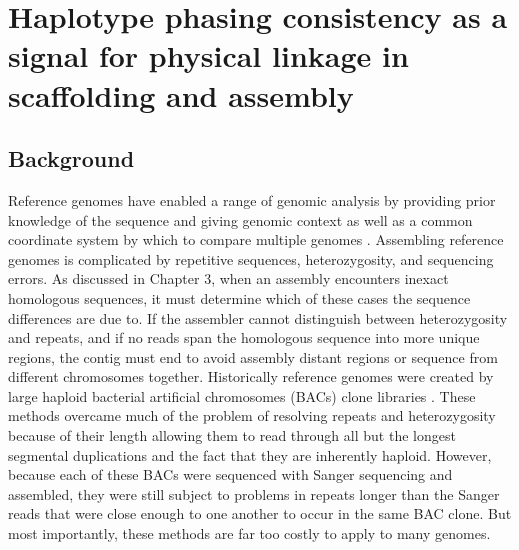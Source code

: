 %
\chapter{Haplotype phasing consistency as a signal for physical linkage in scaffolding and assembly}

\ifpdf
    \graphicspath{{Chapter4/Figs/Raster/}{Chapter4/Figs/PDF/}{Chapter4/Figs/}}
\else
    \graphicspath{{Chapter4/Figs/Vector/}{Chapter4/Figs/}}
\fi



\section{Background}
\par{
Reference genomes have enabled a range of genomic analysis by providing prior knowledge of the sequence 
and giving genomic context as well as a common coordinate system by which to compare multiple genomes \cite{1000genomes} \cite{GRCh38}. Assembling reference genomes is complicated by repetitive sequences, heterozygosity, and sequencing errors. As discussed in Chapter 3, when an assembly encounters inexact homologous sequences, it must determine which of these cases the sequence differences are due to. 
If the assembler cannot distinguish between heterozygosity and repeats, and if no reads span the homologous sequence into more unique regions, the contig must end
to avoid assembly distant regions or sequence from different chromosomes together. Historically reference genomes were created by large haploid bacterial artificial chromosomes (BACs) clone libraries \cite{human}. 
These methods overcame much of the problem of resolving repeats and heterozygosity because of their length allowing them to read through all but the longest segmental duplications and the fact that they are inherently haploid. However, because each of these BACs were sequenced with Sanger sequencing and assembled, they were still subject to problems in repeats longer than the Sanger reads that were close enough to one another to occur in the same BAC clone. But most importantly, these methods are far too costly to apply to many genomes. 
}

